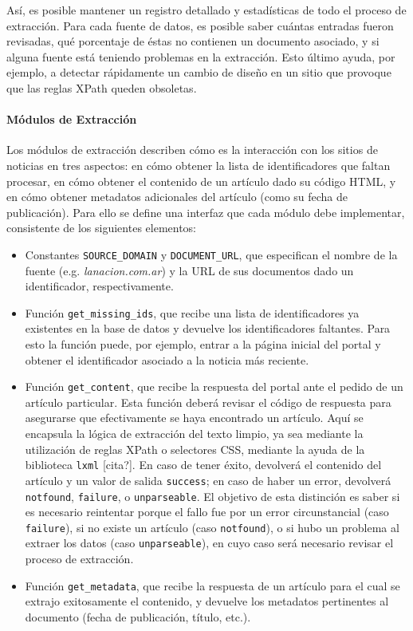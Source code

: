 Así, es posible mantener un registro detallado y estadísticas de todo el proceso de extracción. Para
cada fuente de datos, es posible saber cuántas entradas fueron revisadas, qué porcentaje de éstas no
contienen un documento asociado, y si alguna fuente está teniendo problemas en la extracción. Esto
último ayuda, por ejemplo, a detectar rápidamente un cambio de diseño en un sitio que provoque que
las reglas XPath queden obsoletas.


\paragraph{Módulos de Extracción}

Los módulos de extracción describen cómo es la interacción con los sitios de noticias en tres
aspectos: en cómo obtener la lista de identificadores que faltan procesar, en cómo obtener el
contenido de un artículo dado su código HTML, y en cómo obtener metadatos adicionales del artículo
(como su fecha de publicación). Para ello se define una interfaz que cada módulo debe implementar,
consistente de los siguientes elementos:

\begin{itemize}

\item Constantes \texttt{SOURCE\_DOMAIN} y \texttt{DOCUMENT\_URL}, que especifican el nombre de la
fuente (e.g. \textit{lanacion.com.ar}) y la URL de sus documentos dado un identificador,
respectivamente.

\item Función \texttt{get\_missing\_ids}, que recibe una lista de identificadores ya existentes en la
base de datos y devuelve los identificadores faltantes. Para esto la función puede, por ejemplo,
entrar a la página inicial del portal y obtener el identificador asociado a la noticia más reciente.

\item Función \texttt{get\_content}, que recibe la respuesta del portal ante el pedido de un artículo
particular. Esta función deberá revisar el código de respuesta para asegurarse que efectivamente se
haya encontrado un artículo. Aquí se encapsula la lógica de extracción del texto limpio, ya sea
mediante la utilización de reglas XPath o selectores CSS, mediante la ayuda de la biblioteca
\texttt{lxml} [cita?]. En caso de tener éxito, devolverá el contenido del artículo y un valor de
salida \texttt{success}; en caso de haber un error, devolverá \texttt{notfound}, \texttt{failure}, o
\texttt{unparseable}. El objetivo de esta distinción es saber si es necesario reintentar porque el
fallo fue por un error circunstancial (caso \texttt{failure}), si no existe un artículo (caso
\texttt{notfound}), o si hubo un problema al extraer los datos (caso \texttt{unparseable}), en cuyo
caso será necesario revisar el proceso de extracción.

\item Función \texttt{get\_metadata}, que recibe la respuesta de un artículo para el cual se extrajo
exitosamente el contenido, y devuelve los metadatos pertinentes al documento (fecha de publicación,
título, etc.).

\end{itemize}

